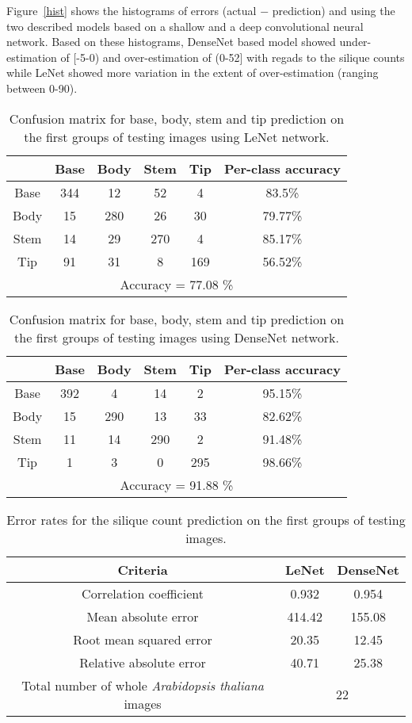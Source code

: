 \documentclass[a4paper,num-refs]{oup-contemporary}
\begin{document}
Figure~\ref{hist} shows the histograms of errors (actual $-$ prediction) and  using the two described models based on a shallow and a deep convolutional neural network. Based on these histograms, DenseNet based model showed under-estimation of [-5-0) and over-estimation of (0-52] with regads to the silique counts while  LeNet showed more variation in the extent of over-estimation (ranging between 0-90).

\begin{table}
\centering
    \caption{Confusion matrix for base, body, stem and tip prediction on the first groups of testing images using LeNet network.}
    \begin{tabular}{c|c c c c c}
	 &  Base &Body&Stem&Tip&Per-class accuracy\\\hline
Base &  344 &	12 &	52 &	4 &	83.5\%\\
Body &	15 &	280 &	26 	&30 & 79.77\%\\
Stem &	14 	&29 &	270 &	4 &	85.17\%\\
Tip  &	91 &	31& 	8 &	169 &	56.52\%\\\hline
\multicolumn{6}{c}{Accuracy = 77.08 \%} \\ \hline  
\end{tabular}
    \label{results_lenet}
\end{table}
\begin{table}
\centering
    \caption{Confusion matrix for base, body, stem and tip prediction on the first groups of testing images using DenseNet network.}
    \begin{tabular}{c|c c c c c}
	 &  Base &Body&Stem&Tip&Per-class accuracy\\\hline
Base &  392 &  4   &  14  &	 2    &   95.15\%\\
Body &	15  &  290 &  13  &  33   &  82.62\%\\
Stem &	11  &  14  &  290 &  2    &  91.48\%\\
Tip  &	1   &  3   &  0   &  295  &  98.66\%\\\hline
\multicolumn{6}{c}{Accuracy = 91.88 \%} \\ \hline  
\end{tabular}
    \label{results_densenet}
\end{table}
\begin{table*}
\centering
    \caption{Error rates for the silique count prediction on the first groups of testing images.}
    \begin{tabular}{c c c }
        \hline
        Criteria & LeNet & DenseNet \\ \hline
        Correlation coefficient & 0.932 & 0.954  \\ 
        Mean absolute error & 414.42 & 155.08 \\
        Root mean squared error & 20.35 & 12.45 \\
        Relative absolute error  & 40.71 & 25.38 \\ 
        \hline
        Total number of whole  \textit{Arabidopsis thaliana} images & \multicolumn{2}{c}{22} \\ \hline
    \end{tabular}
    \label{results}
\end{table*}
\end{document}
